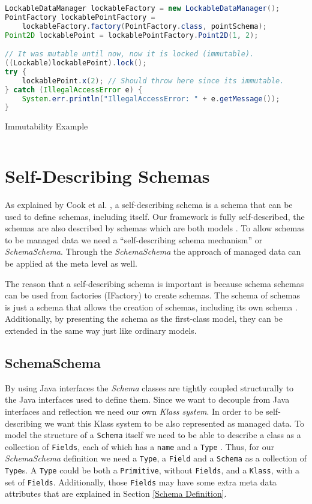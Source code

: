 \begin{sourcecode} [H]
	\begin{lstlisting}[language=Java, escapechar=|]
LockableDataManager lockableFactory = new LockableDataManager();
PointFactory lockablePointFactory = 
	lockableFactory.factory(PointFactory.class, pointSchema);
Point2D lockablePoint = lockablePointFactory.Point2D(1, 2);

// It was mutable until now, now it is locked (immutable).
((Lockable)lockablePoint).lock();
try {
	lockablePoint.x(2); // Should throw here since its immutable.
} catch (IllegalAccessError e) {
	System.err.println("IllegalAccessError: " + e.getMessage());
}
	\end{lstlisting}
	\caption{Immutability Example}
	\label{lst:Immutability Example}
\end{sourcecode}

\section{Self-Describing Schemas}\label{Self-Describing Schemas}
As explained by Cook et al. \cite{loh2012managed}, a self-describing schema is a schema that can be used to define schemas, including itself.
Our framework is fully self-described, the schemas are also described by schemas which are both models \cite{kurtev2006model}. 
To allow schemas to be managed data we need a ``self-describing schema mechanism'' or \textit{SchemaSchema}.
Through the \textit{SchemaSchema} the approach of managed data can be applied at the meta level as well.

The reason that a self-describing schema is important is because schema schemas can be used from factories (IFactory) to create schemas.
The schema of schemas is just a schema that allows the creation of schemas, including its own schema \cite{storm2012object}.
Additionally, by presenting the schema as the first-class model\cite{kurtev2006model}, they can be extended in the same way just like ordinary models.

\subsection{SchemaSchema}\label{sec:SchemaSchema}
By using Java interfaces the \textit{Schema} classes are tightly coupled structurally to the Java interfaces used to define them.
Since we want to decouple from Java interfaces and reflection we need our own \textit{Klass system}.
In order to be self-describing we want this Klass system to be also represented as managed data. 
To model the structure of a \texttt{Schema} itself we need to be able to describe a class as a collection of \texttt{Fields}, each of which has a \texttt{name} and a \texttt{Type} \cite{loh2012managed}. 
Thus, for our \textit{SchemaSchema} definition we need a \texttt{Type}, a \texttt{Field} and a \texttt{Schema} as a collection of \texttt{Type}s. 
A \texttt{Type} could be both a \texttt{Primitive}, without \texttt{Fields}, and a \texttt{Klass}, with a set of \texttt{Fields}.
Additionally, those \texttt{Fields} may have some extra meta data attributes that are explained in Section \ref{Schema Definition}.

